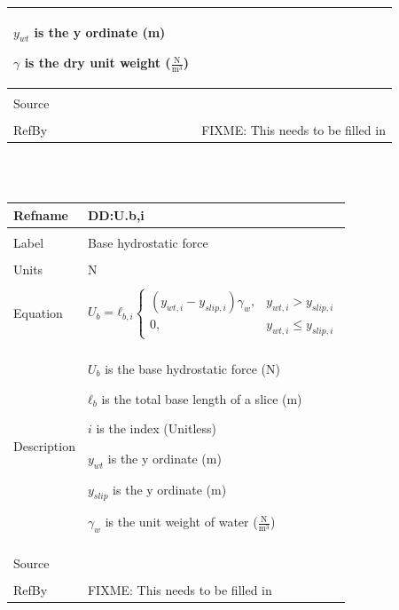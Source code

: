 \documentclass[12pt]{article}
\begin{document}
\begin{minipage}{\textwidth}
\begin{tabular}{p{} p{}}
\begin{symbDescription}
              \item{${y_{wt}}$ is the y ordinate (m)}
              \item{$γ$ is the dry unit weight ($\frac{\text{N}}{\text{m}^{3}}$)}
              \end{symbDescription}
\\ \midrule \\
Source &
\\ \midrule \\
RefBy & FIXME: This needs to be filled in
\\ \bottomrule \end{tabular}
\end{minipage}\\
~\newline
\noindent \begin{minipage}{\textwidth}
\begin{tabular}{p{} p{}}
\toprule \textbf{Refname} & \textbf{DD:U.b,i}
\label{DD:U.b,i}
\\ \midrule \\
Label & Base hydrostatic force
\\ \midrule \\
Units & N
\\ \midrule \\
Equation & \begin{dmath}
           {U_{b}}={ℓ_{b,i}} \begin{cases}
\left({y_{wt,i}}-{y_{slip,i}}\right) {γ_{w}}, & {y_{wt,i}}>{y_{slip,i}}\\
0, & {y_{wt,i}}\leq{}{y_{slip,i}}
\end{cases}
	   \end{dmath}
\\ \midrule \\
Description & \begin{symbDescription}
              \item{${U_{b}}$ is the base hydrostatic force (N)}
              \item{${ℓ_{b}}$ is the total base length of a slice (m)}
              \item{$i$ is the index (Unitless)}
              \item{${y_{wt}}$ is the y ordinate (m)}
              \item{${y_{slip}}$ is the y ordinate (m)}
              \item{${γ_{w}}$ is the unit weight of water ($\frac{\text{N}}{\text{m}^{3}}$)}
              \end{symbDescription}
\\ \midrule \\
Source &
\\ \midrule \\
RefBy & FIXME: This needs to be filled in
\\ \bottomrule \end{tabular}
\end{minipage}\\
\end{document}
